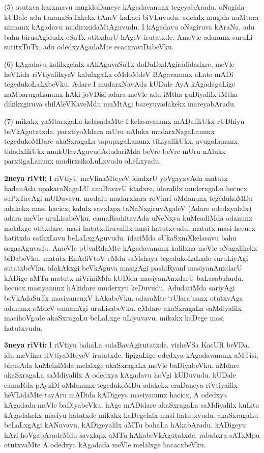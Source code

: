 \documentclass[11pt,a4size]{article}
\begin{document}
(5) otutxva karxmavu mugidoDaneye kAgadavanunx tegeyabAradu. oNagida
    kUDale adu tananxSaTxkekx tAneV kaLaci biVLuvudu. adelalx mugida
    naMtara nimamx kAgadavu mudirxsidaMtAguvudu. I kAgadavu oNagiruva
    kAraNa, adu bahu birusAgidudx eSuTx otitxdarU hAgeV
    irutatxde. AmeVle adanunx suruLi sutitxTuTx, adu odedxyAgadaMte
    ecacxraviDabeVku.

(6) kAgadavu kalilxgelalx sAkAguvaSuTx doDaDxdAgiradidadxre, meVle
    heVLida riVtiyalilxyeV kalulxgaLa oMdoMdeV BAgavanunx aLate mADi
    tegedukoLaLxbeVku. Adare I mudarxNavAda kUDale AyA kAgadagaLige
    naMbarugaLanunx hAki joVDisi adara meVle adu iMtha guDiyalilx
    iMtha dikikxgiruva shilAleVKaveMdu muMtAgi bareyuvadakekx
    mareyabAradu.

(7) mikakx yaMtarxgaLa kelasadaMte I kelasavanunx mADalikUkx rUDhiyu
    beVkAgutatxde. parxtiyoMdara mUru nAlukx mudarxNagaLanunx
    tegedukoMDare akaSxragaLa tapupxgaLanunx tiLiyalikUkx, avugaLanunx
    tidadxlikUkx anukUlavAguvudAdudariMda beVre beVre mUru nAlukx
    parxtigaLanunx mudirxsikoLuLxvudu oLeLxyadu.

\medskip
\textbf{\Large 2neya riVti:}
I riVtiyU meVlinaMteyeV idadxrU yoVgayxvAda matutx hadanAda
upakaraNagaLU anuBavavU idadxre, idaralilx muderxgaLu hecucx
suPxTavAgi mUDuvavu. modalu mudarxkara roVlarf oMdanunx tegedukoMDu
adakekx masi hacicx, kalulx savxlapx taNaNxgiruvAgaleV (Adare
odedxyalalx) adara meVle uruLisabeVku. camaRsahitavAda uNeNxya
kuMcadiMda adanunx melalxge otitxdare, masi hatatxdiruvalilx masi
hatutxvudu, matutx masi hecucx hatitxda sathxLavu
beLaLxgAguvudu. idariMda sUkaSxmXkelasavu bahu sogasAguvadu. AmeVle
pUvaRdaMte kAgadavanunx kalilxna meVle oNagalikekx biDabeVku. matutx
EnAdiVtoV eMdu saMshaya tegedukoLaLxde suruLiyAgi
sutatxbeVku. idakAkxgi beVkAguva masigAgi pashiRyanf masiyanAnxdarU
kADige aMTu matutx niVriniMda kUDida masiyanAnxdarU
baLasabahudu. hecucx masiyanunx hAkidare muderxyu keDuvudu. AdudariMda
sariyAgi beVkAdaSuTx masiyanenxV hAkabeVku. adaraMte `rUlara'nunx
otutxvAga adanunx oMdeV samanAgi uruLisabeVku. eMdare akaSxragaLa
saMdiyalilx masihoVgade akaSxragaLu beLaLxge uLiyuvavu. mikakx kaDege
masi hatutxvudu.

\medskip
\textbf{\Large 3neya riVti:}
I riVtiyu bahaLa sulaBavAgirutatxde. visheVSa KacUR beVDa. idu meVlina
riVtiyaMteyeV irutatxde. lipigaLige odedxya kAgadavanunx aMTisi,
birusAda kuMciniMda melalxge akaSxragaLa meVle baDiyabeVku. aMdare
akaSxragaLa saMdiyalilx A odedxya kAgadavu hoVgi kUDuvudu. kUDale
camaRda pAyxDf oMdanunx tegedukoMDu adakekx eraDaneya riVtiyalilx
heVLidaMte tayAru mADida kADigeya masiyanunx hacicx, A odedxya
kAgadada meVle baDiyabeVku. hAge mADidare akaSxragaLa saMdiyalilx
kuLita kAgadakekx masiyu hatatxde mikakx kaDegelalx masi
hatutxvudu. akaSxragaLu beLaLxgAgi kANuvavu, kADigeyalilx aMTu bahaLa
hAkabAradu. kADigeyu hAri hoVgabAradeMdu savxlapx aMTu
hAkabeVkAgutatxde. rababxra sATxMpu otutxvaMte A odedxya kAgadada
meVle melalxge hacacxbeVku.
\end{document}
